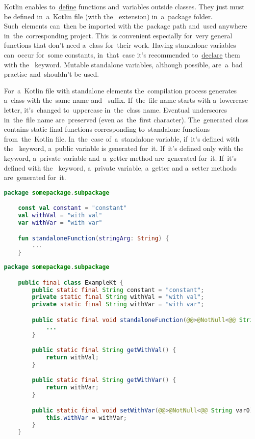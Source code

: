 \label{kotlinstandalone}
Kotlin enables to~\hyperref[declarationdefinition]{define} functions and~variables outside classes.
They just must be defined in~a~Kotlin file (with \mbox{the } extension) in~a~package folder.
Such~elements can~then be imported with the~package path and~used anywhere in~the~corresponding project.
This~is convenient especially for~very general functions that don't need a~class for~their work.
Having standalone variables can~occur for~some constants, in~that~case it's recommended to~\hyperref[declarationdefinition]{declare} them with \mbox{the } keyword.
Mutable standalone variables, although possible, are~a~bad practise and~shouldn't be used.

For~a~Kotlin file with standalone elements the~compilation process generates a~class with the~same name \mbox{and } suffix.
If~the~file name starts with a~lowercase letter, it's~changed to~uppercase in~the~class name.
Eventual underscores in~the~file name are~preserved (even as~the~first character).
The~generated class contains static final functions corresponding to~standalone functions from~the~Kotlin file.
In~the~case of~a~standalone variable, if~it's defined with \mbox{the } keyword, a~public variable is generated for~it.
If~it's defined only with \mbox{the } keyword, a~private variable and~a~getter method are~generated for~it.
If~it's defined with \mbox{the } keyword, a~private variable, a~getter and a~setter methods are~generated for~it.

\example
\begin{lstlisting}[language=Kotlin,title={Kotlin file \itq{Example.kt} with standalone elements}]
    package somepackage.subpackage

    const val constant = "constant"
    val withVal = "with val"
    var withVar = "with var"

    fun standaloneFunction(stringArg: String) {
        ...
    }
\end{lstlisting}

\begin{lstlisting}[language=Java,title={Java equivalent}]
    package somepackage.subpackage

    public final class ExampleKt {
        public static final String constant = "constant";
        private static final String withVal = "with val";
        private static final String withVar = "with var";

        public static final void standaloneFunction(@@>@NotNull<@@ String stringArg) {
            ...
        }

        public static final String getWithVal() {
            return withVal;
        }

        public static final String getWithVar() {
            return withVar;
        }

        public static final void setWithVar(@@>@NotNull<@@ String var0) {
            this.withVar = withVar;
        }
    }
\end{lstlisting}
\newpage

